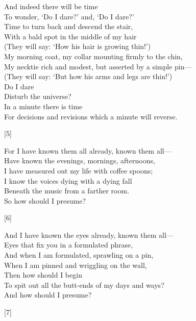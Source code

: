 \documentclass[twoside]{article}
\newcommand\tab[1][1cm]{\hspace*{#1}}
\begin{document}
\begin{multicols}{2}

\begin{minipage}{10cm}
\begin{flushleft}
    \doublespacing
    And indeed there will be time\\
    To wonder, `Do I dare?' and, `Do I dare?'\\
    Time to turn back and descend the stair,\\
    With a bald spot in the middle of my hair\\
    (They will say: `How his hair is growing thin!')\\
    My morning coat, my collar mounting firmly to the chin,\\
    My necktie rich and modest, but asserted by a simple pin---\\
    (They will say: `But how his arms and legs are thin!')\\
    Do I dare\\
    Disturb the universe?\\
    In a minute there is time\\
    For decisions and revisions which a minute will reverse.
    \begin{center}[5]\end{center}
\end{flushleft}
\end{minipage}

\begin{minipage}{9cm}
\begin{flushright}
    \doublespacing
    For I have known them all already, known them all---\\
    Have known the evenings, mornings, afternoons,\\
    I have measured out my life with coffee spoons;\\
    I know the voices dying with a dying fall\\
    Beneath the music from a farther room.\\
    So how should I presume?\tab{}
    \begin{center}[6]\end{center}
\end{flushright}

\begin{minipage}{8cm}
    \doublespacing
    And I have known the eyes already, known them all---\\
    Eyes that fix you in a formulated phrase,\\
    And when I am formulated, sprawling on a pin,\\
    When I am pinned and wriggling on the wall,\\
    Then how should I begin\\
    To spit out all the butt-ends of my days and ways?\\
    \tab{}And how should I presume?
    \begin{center}[7]\end{center}
\end{minipage}


\end{minipage}
\end{multicols}
\end{document}
